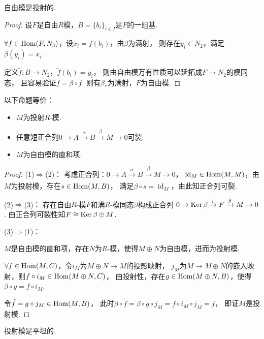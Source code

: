     \begin{proposition}
        自由模是投射的.
    \end{proposition}
\begin{proof}
设$F$是自由$R$模，$B=\{b_i\}_{i\in I}$是$F$的一组基.

$\forall f \in \operatorname{Hom}(F,N_3)$，设$x_i=f(b_i)$，由$\beta$为满射，
则存在$y_i \in N_2$，满足$\beta(y_i)=x_i$.

定义$\tilde f:B\rightarrow N_2$，$\tilde f(b_i)=y_i$，
则由自由模万有性质可以延拓成$F\rightarrow N_2$的模同态，
且容易验证$f=\beta\circ \tilde f$.
则有$\beta_*$为满射，$F$为自由模.
\end{proof}
    \begin{proposition}以下命题等价：
        \begin{itemize}
            \item[1.]$M$为投射$R$-模.
            \item[2.]任意短正合列$0\rightarrow A\xrightarrow{\alpha}B
            \xrightarrow{\beta}M\rightarrow0$可裂.
            \item[3.]$M$为自由模的直和项.
        \end{itemize}
        

    \end{proposition}
\begin{proof}
(1)$\Rightarrow$(2)：
考虑正合列：$0\rightarrow A\xrightarrow[]{\alpha} B \xrightarrow[]{\beta}  M\rightarrow 0$，
$\operatorname{id}_M \in \operatorname{Hom}(M,M)$，由$M$为投射模，存在$s\in \operatorname{Hom}(M,B)$，
满足$\beta \circ s=\operatorname{id}_M$，由此知正合列可裂.

(2)$\Rightarrow$(3)：
存在自由$R$-模$ F $和满$R$-模同态$\beta$构成正合列
$0\rightarrow \operatorname{Ker}\beta \xrightarrow{i} F\xrightarrow{\beta}M\rightarrow0$.
由正合列可裂性知$F\cong \operatorname{Ker}\beta\oplus M$.

(3)$\Rightarrow$(1)：

$ M $是自由模的直和项，存在$ N $为$ R $-模，使得$M\oplus N$为自由模，进而为投射模.

$\forall f \in \operatorname{Hom}(M,C)$，令$i_M$为$M\oplus N\rightarrow M$的投影映射，
$j_M$为$M\rightarrow M\oplus N$的嵌入映射，则$f\circ i_M\in \operatorname{Hom}(M\oplus N,C)$，
由投射性，存在$g\in \operatorname{Hom}(M\oplus N,B)$，使得$\beta \circ g=f\circ i_M$.

令$\tilde{f}=g\circ j_M \in \operatorname{Hom}(M,B)$，
此时$\beta \circ \tilde{f}=\beta \circ g\circ j_M=f\circ i_M \circ j_M=f$，
即证$ M $是投射模. 
\end{proof}
    \begin{proposition}
        投射模是平坦的.
    \end{proposition}
